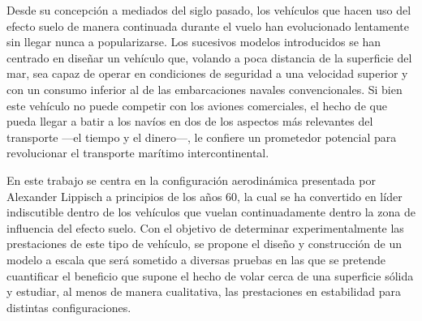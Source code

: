Desde su concepción a mediados del siglo pasado, los vehículos que hacen uso del efecto suelo de manera continuada durante el vuelo han evolucionado lentamente sin llegar nunca a popularizarse. Los sucesivos modelos introducidos se han centrado en diseñar un vehículo que, volando a poca distancia de la superficie del mar, sea capaz de operar en condiciones de seguridad a una velocidad superior y con un consumo inferior al de las embarcaciones navales convencionales. Si bien este vehículo no puede competir con los aviones comerciales, el hecho de que pueda llegar a batir a los navíos en dos de los aspectos más relevantes del transporte —el tiempo y el dinero—, le confiere un prometedor potencial para revolucionar el transporte marítimo intercontinental.

En este trabajo se  centra en la configuración aerodinámica presentada por Alexander Lippisch a principios de los años 60, la cual se ha convertido en líder indiscutible dentro de los vehículos que vuelan continuadamente dentro la zona de influencia del efecto suelo. Con el objetivo de determinar experimentalmente las prestaciones de este tipo de vehículo, se propone el diseño y construcción de un modelo a escala que será sometido a diversas pruebas en las que se pretende cuantificar el beneficio que supone el hecho de volar cerca de una superficie sólida y estudiar, al menos de manera cualitativa, las prestaciones en estabilidad para distintas configuraciones.